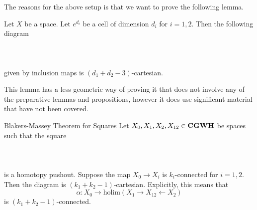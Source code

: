 \documentclass[a4paper]{article}
\begin{document}
The reasons for the above setup is that we want to prove the following lemma. 

\begin{lmm}{}{} Let $X$ be a space. Let $e^{d_i}$ be a cell of dimension $d_i$ for $i=1,2$. Then the following diagram \\~\\
\\~\\
given by inclusion maps is $(d_1+d_2-3)$-cartesian. 
\end{lmm}

This lemma has a less geometric way of proving it that does not involve any of the preparative lemmas and propositions, however it does use significant material that have not been covered. 

\begin{thm}{Blakers-Massey Theorem for Squares}{} Let $X_0,X_1,X_2,X_{12}\in\bold{CGWH}$ be spaces such that the square \\~\\
\\~\\
is a homotopy pushout. Suppose the map $X_0\to X_i$ is $k_i$-connected for $i=1,2$. Then the diagram is $(k_1+k_2-1)$-cartesian. Explicitly, this means that $$\alpha:X_0\to\text{holim}(X_1\rightarrow X_{12}\leftarrow X_2)$$ is $(k_1+k_2-1)$-connected. 
\end{thm}
\end{document}
